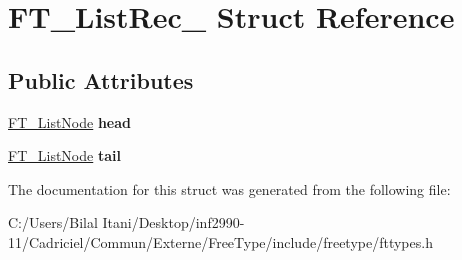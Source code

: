 \hypertarget{struct_f_t___list_rec__}{}\section{F\+T\+\_\+\+List\+Rec\+\_\+ Struct Reference}
\label{struct_f_t___list_rec__}
\subsection*{Public Attributes}
\begin{DoxyCompactItemize}
\item 
\hyperlink{struct_f_t___list_node_rec__}{F\+T\+\_\+\+List\+Node} {\bfseries head}\hypertarget{struct_f_t___list_rec___a09ed35c2bcdc1c3acd12ff4650dfdeb9}{}\label{struct_f_t___list_rec___a09ed35c2bcdc1c3acd12ff4650dfdeb9}

\item 
\hyperlink{struct_f_t___list_node_rec__}{F\+T\+\_\+\+List\+Node} {\bfseries tail}\hypertarget{struct_f_t___list_rec___a4664761f0ab2af3d48231b00cd978b23}{}\label{struct_f_t___list_rec___a4664761f0ab2af3d48231b00cd978b23}

\end{DoxyCompactItemize}


The documentation for this struct was generated from the following file\+:\begin{DoxyCompactItemize}
\item 
C\+:/\+Users/\+Bilal Itani/\+Desktop/inf2990-\/11/\+Cadriciel/\+Commun/\+Externe/\+Free\+Type/include/freetype/fttypes.\+h\end{DoxyCompactItemize}
